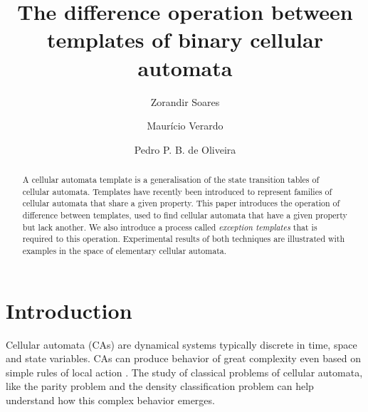 \documentclass{llncs}
\begin{document}
\pagestyle{headings}

\title{The difference operation between templates of binary cellular automata}


\author{Zorandir Soares \and Maurício Verardo \and
Pedro P. B. de Oliveira}




\maketitle

\begin{abstract}
A cellular automata template is a generalisation of the state transition tables of cellular automata. Templates have recently been introduced to represent families of cellular automata that share a given property. This paper introduces the operation of difference between templates, used to find cellular automata that have a given property but lack another. We also introduce a process called \textit{exception templates} that is required to this operation. Experimental results of both techniques are illustrated with examples in the space of elementary cellular automata.
\end{abstract}

\section{Introduction}
\label{sec:introducao}
Cellular automata (CAs) are dynamical systems typically discrete in time, space and state variables.
CAs can produce behavior of great complexity even based on simple rules of local action \cite{wolfram2002}. The study of classical problems of cellular automata, like the parity problem \cite{Betel2013} and the density classification problem \cite{deOliveira2014density} can help understand how this complex behavior emerges.
\end{document}
